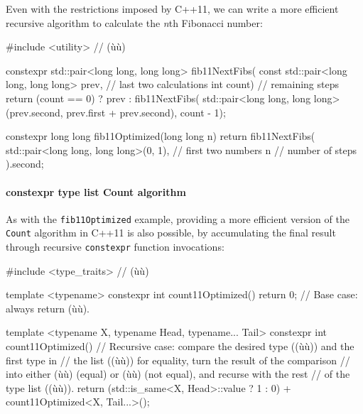 Even with the restrictions imposed by C++11, we can write a
more efficient recursive algorithm to calculate the \emph{n\/}th
Fibonacci number:

\begin{emcppslisting}
#include <utility>  // (ù{}ù)

constexpr std::pair<long long, long long> fib11NextFibs(
    const std::pair<long long, long long> prev,  // last two calculations
    int count)                                   // remaining steps
{
    return (count == 0) ? prev : fib11NextFibs(
        std::pair<long long, long long>(prev.second,
                                        prev.first + prev.second),
        count - 1);
}

constexpr long long fib11Optimized(long long n)
{
    return fib11NextFibs(
        std::pair<long long, long long>(0, 1), // first two numbers
        n                                      // number of steps
    ).second;
}
\end{emcppslisting}


\paragraph[\lstinline!constexpr! type list \lstinline!Count! algorithm]{{\ParaCode constexpr} type list {\ParaCode Count} algorithm}\label{constexpr-typelist-count-algorithm}

As with the \lstinline!fib11Optimized! example, providing a more efficient version of the \lstinline!Count! algorithm in
C++11 is also possible, by accumulating the final result through recursive
\lstinline!constexpr! function invocations:

\begin{emcppslisting}
#include <type_traits>  // (ù{}ù)

template <typename>
constexpr int count11Optimized() { return 0; }
    // Base case: always return (ù{}ù).

template <typename X, typename Head, typename... Tail>
constexpr int count11Optimized()
    // Recursive case: compare the desired type ((ù{}ù)) and the first type in
    // the list ((ù{}ù)) for equality, turn the result of the comparison
    // into either (ù{}ù) (equal) or (ù{}ù) (not equal), and recurse with the rest
    // of the type list ((ù{}ù)).
{
    return (std::is_same<X, Head>::value ? 1 : 0)
        + count11Optimized<X, Tail...>();
}
\end{emcppslisting}

